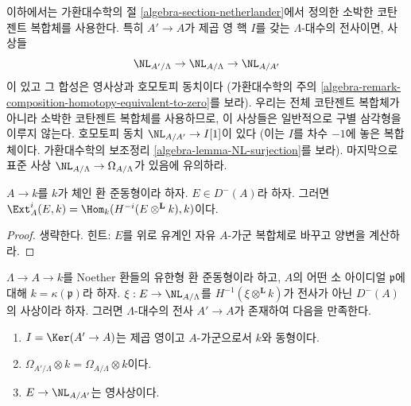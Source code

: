 \medskip\noindent
이하에서는 가환대수학의 절 \ref{algebra-section-netherlander}에서
정의한 소박한 코탄젠트 복합체를 사용한다.
특히 $A' \to A$가 제곱 영 핵 $I$를 갖는 $\Lambda$-대수의 전사이면,
사상들
$$
\NL_{A'/\Lambda} \to \NL_{A/\Lambda} \to \NL_{A/A'}
$$
이 있고 그 합성은 영사상과 호모토피 동치이다 (가환대수학의
주의 \ref{algebra-remark-composition-homotopy-equivalent-to-zero}를 보라).
우리는 전체 코탄젠트 복합체가 아니라 소박한 코탄젠트 복합체를 사용하므로,
이 사상들은 일반적으로 구별 삼각형을 이루지 않는다.
호모토피 동치 $\NL_{A/A'} \to I[1]$이 있다 (이는 $I$를 차수 $-1$에
놓은 복합체이다. 가환대수학의 보조정리 \ref{algebra-lemma-NL-surjection}를 보라).
마지막으로 표준 사상 $\NL_{A/\Lambda} \to \Omega_{A/\Lambda}$가
있음에 유의하라.

\begin{lemma}
\label{lemma-compute-ext-into-field}
$A \to k$를 $k$가 체인 환 준동형이라 하자. $E \in D^-(A)$라 하자.
그러면 $\Ext^i_A(E, k) = \Hom_k(H^{-i}(E \otimes^\mathbf{L} k), k)$이다.
\end{lemma}

\begin{proof}
생략한다. 힌트: $E$를 위로 유계인 자유 $A$-가군 복합체로 바꾸고
양변을 계산하라.
\end{proof}

\begin{lemma}
\label{lemma-construct-essential-surjection}
$\Lambda \to A \to k$를 Noether 환들의 유한형 환 준동형이라 하고,
$A$의 어떤 소 아이디얼 $\mathfrak p$에 대해 $k = \kappa(\mathfrak p)$라 하자.
$\xi : E \to \NL_{A/\Lambda}$를
$H^{-1}(\xi \otimes^{\mathbf{L}} k)$가 전사가 아닌 $D^{-}(A)$의 사상이라 하자.
그러면 $\Lambda$-대수의 전사 $A' \to A$가 존재하여 다음을 만족한다.
\begin{enumerate}
\item[(a)] $I = \Ker(A' \to A)$는 제곱 영이고 $A$-가군으로서 $k$와 동형이다.
\item[(b)] $\Omega_{A'/\Lambda} \otimes k = \Omega_{A/\Lambda} \otimes k$이다.
\item[(c)] $E \to \NL_{A/A'}$는 영사상이다.
\end{enumerate}
\end{lemma}

